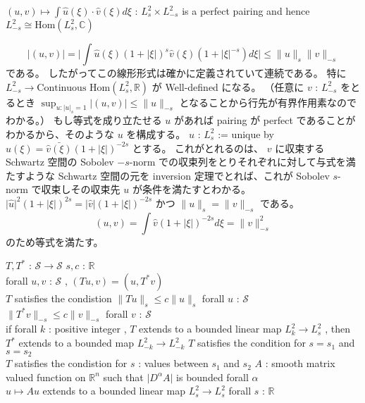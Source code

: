 \begin{Theorem}
\itemprop
  \Then \((u,v) \mapsto \int \hat{u}(\xi) \cdot \hat{v}(\xi) d \xi\) : \(L_s^2 \times L_{-s}^2\) is a perfect pairing and hence \(L_{-s}^2 \cong \text{Hom}(L_s^2 , \mathbb{C})\)
\end{Theorem}

\begin{Proof}
\itemprof
  \[\lvert (u,v) \rvert = \lvert \int \hat{u}(\xi)(1 + \lvert \xi \rvert)^s \hat{v}(\xi)(1 + \lvert \xi \rvert^{-s}) d \xi \rvert \leq \lVert u \rVert_s \lVert v \rVert_{-s}\]
  である。
  したがってこの線形形式は確かに定義されていて連続である。
  特に \(L_{-s}^2 \to \text{Continuous Hom}(L_{s}^2 , \mathbb{R})\) が Well-defined になる。
  （任意に \(v\) : \(L_{-s}^2\) をとるとき \(\sup_{u : \lvert u \rvert_s = 1} \lvert (u,v) \rvert \leq \lVert u \rVert_{-s}\) となることから行先が有界作用素なのでわかる。）
  もし等式を成り立たせる \(u\) があれば pairing が perfect であることがわかるから、そのような \(u\) を構成する。
  \(u\) : \(L_s^2\) := unique by \(\hat{u}(\xi) = \bar{\hat{v}(\xi)}(1 + \lvert \xi \rvert)^{-2s}\) とする。
  これがとれるのは、 \(v\) に収束する Schwartz 空間の Sobolev \(-s\)-norm での収束列をとりそれぞれに対して与式を満たすような Schwartz 空間の元を inversion 定理でとれば、これが Sobolev \(s\)-norm で収束しその収束先 \(u\) が条件を満たすとわかる。
   \(\lvert \hat{u} \rvert^2 (1 + \lvert \xi \rvert)^{2s} = \lvert \hat{v} \rvert(1 + \lvert \xi \rvert)^{-2s}\) かつ \(\lVert u \rVert_s = \lVert v \rVert_{-s}\) である。
  \[(u,v) = \int \hat{v}(1 + \lvert \xi \rvert)^{-2s} d \xi = \lVert v \rVert_{-s}^2\]
  のため等式を満たす。
\end{Proof}

\begin{Theorem}
\itemprop
  \For \(T,T^*\) : \(\mathscr{S} \to \mathscr{S}\) \(s,c\) : \(\mathbb{R}\) \\
  \IfHold forall \(u,v\) : \(\mathscr{S}\) , \((Tu , v) = (u , T^*v)\) \\
  \IfHold \(T\) satisfies the condistion \(\lVert Tu \rVert_s \leq c \lVert u \rVert_s\) forall \(u\) : \(\mathscr{S}\) \\
  \Then \(\lVert T^* v \rVert_{-s} \leq c \lVert v \rVert_{-s}\) forall \(v\) : \(\mathscr{S}\) \\
  \Then if forall \(k\) : positive integer , \(T\) extends to a bounded linear map \(L_k^2 \to L_s^2\) , then \(T^*\) extends to a bounded map \(L_{-k}^2 \to L_{-k}^2\)
\itemprop
  \IfHold \(T\) satisfies the condition for \(s = s_1\) and \(s = s_2\) \\
  \Then \(T\) satisfies the condistion for \(s\) : values between \(s_1\) and \(s_2\)
\itemprop
  \For \(A\) : smooth matrix valued function on \(\mathbb{R}^n\) such that \(\lvert D^\alpha A \rvert\) is bounded forall \(\alpha\) \\
  \Then \(u \mapsto A u\) extends to a bounded linear map \(L^2_s \to L^2_s\) forall \(s\) : \(\mathbb{R}\)
\end{Theorem}

